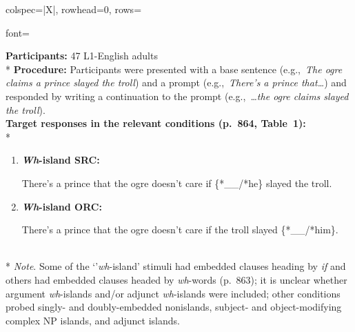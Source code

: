 \begin{longtblr}[caption={\textcite{morgan.wagers2018}: RC elicitation task}, label={tblr:gap-wi-mw18}]{colspec={|X|}, rowhead=0, rows={font=\raggedright{}}}\hline
\textbf{Participants:} 47 L1-English adults \vspace{5pt}\\*
\textbf{Procedure:} Participants were presented with a base sentence (e.g.,~\textit{The ogre claims a prince slayed the troll}) and a prompt (e.g.,~\textit{There's a prince that\dots}) and responded by writing a continuation to the prompt (e.g.,~\textit{\dots the ogre claims slayed the troll}). \vspace{5pt}\\
\textbf{Target responses in the relevant conditions (p.~864, Table~1):} \vspace{5pt}\\*
\begin{varwidth}{\linewidth}\begin{enumerate}[\bfseries (a),itemsep=5pt] 
\item \textbf{\textit{Wh}-island SRC:}\par\nobreak\vspace{3pt}
There's a prince that the ogre doesn't care if \{*\_\_/*he\} slayed the troll.
\item \textbf{\textit{Wh}-island ORC:}\par\nobreak\vspace{3pt}
There's a prince that the ogre doesn't care if the troll slayed \{*\_\_/*him\}.
\end{enumerate}\end{varwidth}\vspace{5pt}\\*
\textit{Note}. Some of the `'\textit{wh}-island' stimuli had embedded clauses heading by \textit{if} and others had embedded clauses headed by \textit{wh}-words (p.~863); it is unclear whether argument \textit{wh}-islands and/or adjunct \textit{wh}-islands were included; other conditions probed singly- and doubly-embedded nonislands, subject- and object-modifying complex NP islands, and adjunct islands. \\\hline
\end{longtblr}

